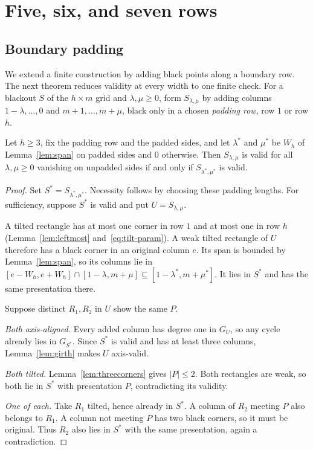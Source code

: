 \section{Five, six, and seven rows}\label{sec:five}

\subsection{Boundary padding}

We extend a finite construction by adding black points along a boundary row.
The next theorem reduces validity at every width to one finite check.
For a blackout $S$ of the $h\times m$ grid and $\lambda,\mu\ge0$, form $S_{\lambda,\mu}$ by
adding columns $1-\lambda,\dots,0$ and $m+1,\dots,m+\mu$, black only in a chosen
\emph{padding row}, row $1$ or row $h$.

\begin{theorem}\label{thm:collar}
Let $h\ge3$, fix the padding row and the padded sides, and let $\lambda^*$ and $\mu^*$ be $W_h$ of
Lemma~\ref{lem:span} on padded sides and $0$ otherwise. Then $S_{\lambda,\mu}$ is valid for all
$\lambda,\mu\ge0$ vanishing on unpadded sides if and only if $S_{\lambda^*,\mu^*}$ is valid.
\end{theorem}

\begin{proof}
Set $S^*=S_{\lambda^*,\mu^*}$. Necessity follows by choosing these padding lengths.
For sufficiency, suppose $S^*$ is valid and put $U=S_{\lambda,\mu}$.

A tilted rectangle has at most one corner in row $1$ and at most one
in row $h$ (Lemma~\ref{lem:leftmost} and~\eqref{eq:tilt-param}).
A weak tilted rectangle of $U$ therefore has a black corner in an
original column $e$. Its span is bounded by Lemma~\ref{lem:span}, so
its columns lie in $[e-W_h,e+W_h]\cap[1-\lambda,m+\mu]\subseteq[1-\lambda^*,m+\mu^*]$.
It lies in $S^*$ and has the same presentation there.

Suppose distinct $R_1,R_2$ in $U$ show the same $P$.

\emph{Both axis-aligned.} Every added column has degree one in $G_U$,
so any cycle already lies in $G_{S^*}$. Since $S^*$ is valid and has
at least three columns, Lemma~\ref{lem:girth} makes $U$ axis-valid.

\emph{Both tilted.} Lemma~\ref{lem:threecorners} gives $|P|\le2$.
Both rectangles are weak, so both lie in $S^*$ with presentation $P$,
contradicting its validity.

\emph{One of each.} Take $R_1$ tilted, hence already in $S^*$.
A column of $R_2$ meeting $P$ also belongs to $R_1$. A column not
meeting $P$ has two black corners, so it must be original.
Thus $R_2$ also lies in $S^*$ with the same presentation, again a
contradiction.
\end{proof}


